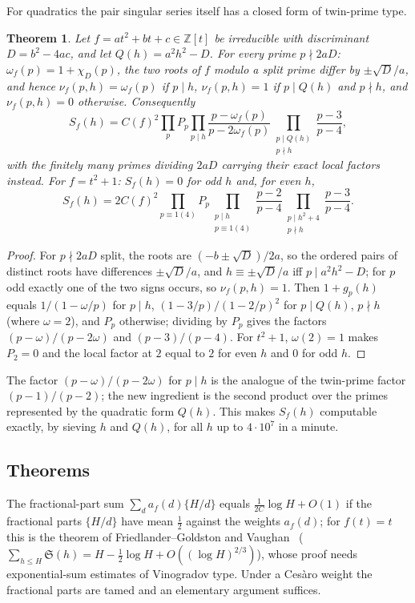 \documentclass[11pt,a4paper]{article}
\newtheorem{theorem}{Theorem}
\theoremstyle{remark}\newtheorem{remark}[theorem]{Remark}
\newcommand{\Z}{\mathbb{Z}}
\newcommand{\Sig}{\mathfrak S}
\begin{document}
For quadratics the pair singular series itself has a closed form of twin-prime type.

\begin{theorem}\label{thm:quadratic}
Let $f=at^2+bt+c\in\Z[t]$ be irreducible with discriminant $D=b^2-4ac$, and let $Q(h)=a^2h^2-D$. For
every prime $p\nmid 2aD$: $\omega_f(p)=1+\chi_D(p)$, the two roots of $f$ modulo a split prime differ by
$\pm\sqrt D/a$, and hence $\nu_f(p,h)=\omega_f(p)$ if $p\mid h$, $\nu_f(p,h)=1$ if $p\mid Q(h)$ and $p\nmid h$,
and $\nu_f(p,h)=0$ otherwise. Consequently
\[
S_f(h)=C(f)^2\prod_pP_p\!\prod_{p\mid h}\!\frac{p-\omega_f(p)}{p-2\omega_f(p)}\!\prod_{\substack{p\mid Q(h)\\p\nmid h}}\!\frac{p-3}{p-4},
\]
with the finitely many primes dividing $2aD$ carrying their exact local factors instead. For $f=t^2+1$: $S_f(h)=0$ for odd $h$ and, for even $h$,
\[
S_f(h)=2C(f)^2\prod_{p\equiv1(4)}P_p\prod_{\substack{p\mid h\\ p\equiv1(4)}}\frac{p-2}{p-4}\prod_{\substack{p\mid h^2+4\\ p\nmid h}}\frac{p-3}{p-4}.
\]
\end{theorem}

\begin{proof}
For $p\nmid 2aD$ split, the roots are $(-b\pm\sqrt D)/2a$, so the ordered pairs of distinct roots have
differences $\pm\sqrt D/a$, and $h\equiv\pm\sqrt D/a$ iff $p\mid a^2h^2-D$; for $p$ odd exactly one of the two
signs occurs, so $\nu_f(p,h)=1$. Then $1+g_p(h)$ equals $1/(1-\omega/p)$ for $p\mid h$, $(1-3/p)/(1-2/p)^2$
for $p\mid Q(h)$, $p\nmid h$ (where $\omega=2$), and $P_p$ otherwise; dividing by $P_p$ gives the factors
$(p-\omega)/(p-2\omega)$ and $(p-3)/(p-4)$. For $t^2+1$, $\omega(2)=1$ makes $P_2=0$ and the local factor at
$2$ equal to $2$ for even $h$ and $0$ for odd $h$.
\end{proof}

The factor $(p-\omega)/(p-2\omega)$ for $p\mid h$ is the analogue of the twin-prime factor $(p-1)/(p-2)$;
the new ingredient is the second product over the primes represented by the quadratic form $Q(h)$. This
makes $S_f(h)$ computable exactly, by sieving $h$ and $Q(h)$, for all $h$ up to $4\cdot10^7$ in a minute.

\subsection{Theorems}\label{sec:thms}

The fractional-part sum $\sum_d a_f(d)\{H/d\}$ equals $\frac1{2C}\log H+O(1)$ if the fractional parts
$\{H/d\}$ have mean $\tfrac12$ against the weights $a_f(d)$; for $f(t)=t$ this is the theorem of
Friedlander--Goldston and Vaughan~\cite{FriedlanderGoldston1995,Vaughan2001}
($\sum_{h\le H}\Sig(h)=H-\tfrac12\log H+O((\log H)^{2/3})$), whose proof needs exponential-sum
estimates of Vinogradov type. Under a Ces\`aro weight the fractional parts are tamed and an elementary
argument suffices.
\end{document}
